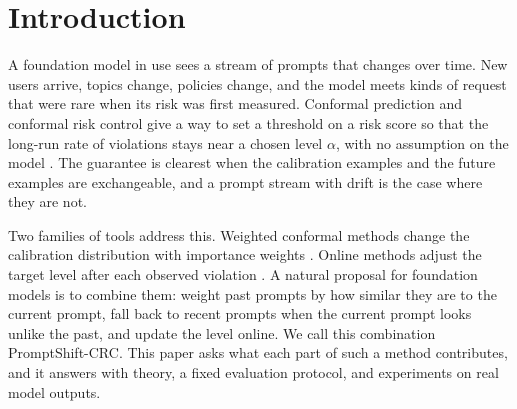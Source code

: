 
\section{Introduction}\label{sec:intro}

A foundation model in use sees a stream of prompts that changes over time. New users arrive, topics change, policies change, and the model meets kinds of request that were rare when its risk was first measured. Conformal prediction and conformal risk control give a way to set a threshold on a risk score so that the long-run rate of violations stays near a chosen level $\alpha$, with no assumption on the model \citep{vovk2005algorithmic,angelopoulos2021gentle,angelopoulos2024conformal}. The guarantee is clearest when the calibration examples and the future examples are exchangeable, and a prompt stream with drift is the case where they are not.

Two families of tools address this. Weighted conformal methods change the calibration distribution with importance weights \citep{tibshirani2019conformal,barber2023beyond}. Online methods adjust the target level after each observed violation \citep{gibbs2021adaptive,gibbs2024online,angelopoulos2023pid}. A natural proposal for foundation models is to combine them: weight past prompts by how similar they are to the current prompt, fall back to recent prompts when the current prompt looks unlike the past, and update the level online. We call this combination PromptShift-CRC. This paper asks what each part of such a method contributes, and it answers with theory, a fixed evaluation protocol, and experiments on real model outputs.

